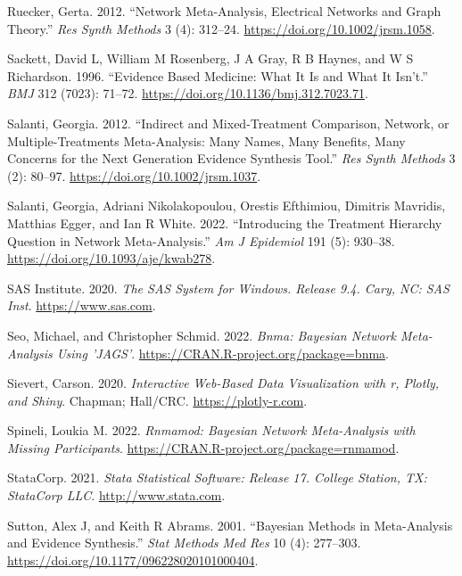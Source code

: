 \begin{CSLReferences}{1}{0}
\leavevmode{}%
Ruecker, Gerta. 2012. {``Network Meta-Analysis, Electrical Networks and Graph Theory.''} \emph{Res Synth Methods} 3 (4): 312--24. \url{https://doi.org/10.1002/jrsm.1058}.

\leavevmode{}%
Sackett, David L, William M Rosenberg, J A Gray, R B Haynes, and W S Richardson. 1996. {``Evidence Based Medicine: What It Is and What It Isn't.''} \emph{BMJ} 312 (7023): 71--72. \url{https://doi.org/10.1136/bmj.312.7023.71}.

\leavevmode{}%
Salanti, Georgia. 2012. {``Indirect and Mixed-Treatment Comparison, Network, or Multiple-Treatments Meta-Analysis: Many Names, Many Benefits, Many Concerns for the Next Generation Evidence Synthesis Tool.''} \emph{Res Synth Methods} 3 (2): 80--97. \url{https://doi.org/10.1002/jrsm.1037}.

\leavevmode{}%
Salanti, Georgia, Adriani Nikolakopoulou, Orestis Efthimiou, Dimitris Mavridis, Matthias Egger, and Ian R White. 2022. {``Introducing the Treatment Hierarchy Question in Network Meta-Analysis.''} \emph{Am J Epidemiol} 191 (5): 930--38. \url{https://doi.org/10.1093/aje/kwab278}.

\leavevmode{}%
SAS Institute. 2020. \emph{{The SAS System for Windows}. Release 9.4. Cary, NC: SAS Inst}. \url{https://www.sas.com}.

\leavevmode{}%
Seo, Michael, and Christopher Schmid. 2022. \emph{Bnma: Bayesian Network Meta-Analysis Using 'JAGS'}. \url{https://CRAN.R-project.org/package=bnma}.

\leavevmode{}%
Sievert, Carson. 2020. \emph{{Interactive Web-Based Data Visualizatio}n with r, Plotly, and Shiny}. Chapman; Hall/CRC. \url{https://plotly-r.com}.

\leavevmode{}%
Spineli, Loukia M. 2022. \emph{Rnmamod: Bayesian Network Meta-Analysis with Missing Participants}. \url{https://CRAN.R-project.org/package=rnmamod}.

\leavevmode{}%
StataCorp. 2021. \emph{{Stata Statistical Software: Release 17}. College Station, TX: StataCorp LLC}. \url{http://www.stata.com}.

\leavevmode{}%
Sutton, Alex J, and Keith R Abrams. 2001. {``Bayesian Methods in Meta-Analysis and Evidence Synthesis.''} \emph{Stat Methods Med Res} 10 (4): 277--303. \url{https://doi.org/10.1177/096228020101000404}.


\end{CSLReferences}
